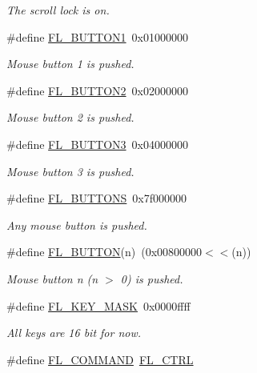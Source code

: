 \begin{Indent}
\begin{DoxyCompactItemize}
\begin{DoxyCompactList}\small\item\em The scroll lock is on. \end{DoxyCompactList}\item 
\#define \hyperlink{_enumerations_8_h_afe37a4db5e516754bb8963cd341bf415}{F\+L\+\_\+\+B\+U\+T\+T\+O\+N1}~0x01000000
\begin{DoxyCompactList}\small\item\em Mouse button 1 is pushed. \end{DoxyCompactList}\item 
\#define \hyperlink{_enumerations_8_h_a1b597a61f3be6323bce3e8c54283b2b3}{F\+L\+\_\+\+B\+U\+T\+T\+O\+N2}~0x02000000
\begin{DoxyCompactList}\small\item\em Mouse button 2 is pushed. \end{DoxyCompactList}\item 
\#define \hyperlink{_enumerations_8_h_a9609bc7247660e05194c4e639f84e24e}{F\+L\+\_\+\+B\+U\+T\+T\+O\+N3}~0x04000000
\begin{DoxyCompactList}\small\item\em Mouse button 3 is pushed. \end{DoxyCompactList}\item 
\#define \hyperlink{_enumerations_8_h_a6862e0de33aa388ec19a5e0cf3327bb7}{F\+L\+\_\+\+B\+U\+T\+T\+O\+NS}~0x7f000000
\begin{DoxyCompactList}\small\item\em Any mouse button is pushed. \end{DoxyCompactList}\item 
\#define \hyperlink{_enumerations_8_h_a9c1d8f71cc0a6c159eac4f250ead7687}{F\+L\+\_\+\+B\+U\+T\+T\+ON}(n)~(0x00800000$<$$<$(n))
\begin{DoxyCompactList}\small\item\em Mouse button n (n $>$ 0) is pushed. \end{DoxyCompactList}\item 
\#define \hyperlink{_enumerations_8_h_aada64e9d1e7f5cecd3629de290b18927}{F\+L\+\_\+\+K\+E\+Y\+\_\+\+M\+A\+SK}~0x0000ffff
\begin{DoxyCompactList}\small\item\em All keys are 16 bit for now. \end{DoxyCompactList}\item 
\#define \hyperlink{_enumerations_8_h_a5d4011c75b1fe25d9ef36e8ae9e2995c}{F\+L\+\_\+\+C\+O\+M\+M\+A\+ND}~\hyperlink{_enumerations_8_h_a29324ec5ac8c1d87950127d387dc83e8}{F\+L\+\_\+\+C\+T\+RL}
$$
\end{DoxyCompactItemize}
\end{Indent}
